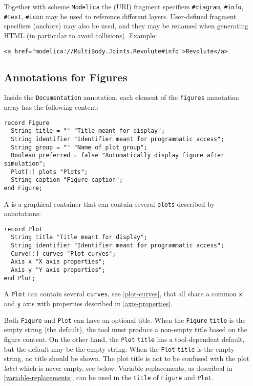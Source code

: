 Together with scheme \lstinline!Modelica! the (URI) fragment specifiers
\lstinline!#diagram!, \lstinline!#info!, \lstinline!#text!, \lstinline!#icon! may be used to reference different
layers. User-defined fragment specifiers (anchors) may also be used, and they may be renamed
when generating HTML (in particular to avoid collisions).
Example:
\begin{lstlisting}[language=modelica]
<a href="modelica://MultiBody.Joints.Revolute#info">Revolute</a>
\end{lstlisting}

\subsection{Annotations for Figures}\label{annotations-for-figures}

Inside the \lstinline!Documentation! annotation, each element of the \lstinline!figures! annotation array has the following content:
\begin{lstlisting}[language=modelica]
record Figure
  String title = "" "Title meant for display";
  String identifier "Identifier meant for programmatic access";
  String group = "" "Name of plot group";
  Boolean preferred = false "Automatically display figure after simulation";
  Plot[:] plots "Plots";
  String caption "Figure caption";
end Figure;
\end{lstlisting}

A  is a graphical container that can contain several \lstinline!plots! described by  annotations:
\begin{lstlisting}[language=modelica]
record Plot
  String title "Title meant for display";
  String identifier "Identifier meant for programmatic access";
  Curve[:] curves "Plot curves";
  Axis x "X axis properties";
  Axis y "Y axis properties";
end Plot;
\end{lstlisting}

A \lstinline!Plot! can contain several \lstinline!curves!, see \cref{plot-curves}, that all share a common \lstinline!x! and \lstinline!y! axis with properties described in \cref{axis-properties}.

Both \lstinline!Figure! and \lstinline!Plot! can have an optional title. When
the \lstinline!Figure! \lstinline!title! is the empty string (the default), the
tool must produce a non-empty title based on the figure content.  On the other
hand, the \lstinline!Plot! \lstinline!title! has a tool-dependent default, but
the default may be the empty string.  When the \lstinline!Plot! \lstinline!title! is the empty string, no
title should be shown. The plot title is not to be confused with the plot
\emph{label} which is never empty, see below. Variable replacements, as
described in \cref{variable-replacements}, can be used in the
\lstinline!title! of \lstinline!Figure! and \lstinline!Plot!.

